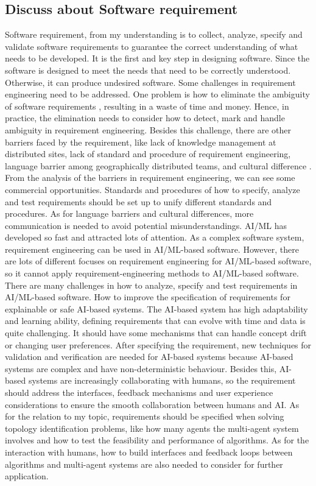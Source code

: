 \documentclass[11pt]{article}
\begin{document}
\subsection*{Discuss about Software requirement}
Software requirement, from my understanding is to collect, analyze, specify and validate software requirements to guarantee the correct understanding of what needs to be developed. It is the first and key step in designing software. Since the software is designed to meet the needs that need to be correctly understood. Otherwise, it can produce undesired software. Some challenges in requirement engineering need to be addressed. One problem is how to eliminate the ambiguity of software requirements \cite{gervasi2019ambiguity}, resulting in a waste of time and money. Hence, in practice, the elimination needs to consider how to detect, mark and handle ambiguity in requirement engineering. Besides this challenge, there are other barriers faced by the requirement, like lack of knowledge management at distributed sites, lack of standard and procedure of requirement engineering, language barrier among geographically distributed teams, and cultural difference \cite{akbar2020systematic}. From the analysis of the barriers in requirement engineering, we can see some commercial opportunities. Standards and procedures of how to specify, analyze and test requirements should be set up to unify different standards and procedures. As for language barriers and cultural differences, more communication is needed to avoid potential misunderstandings. AI/ML has developed so fast and attracted lots of attention. As a complex software system, requirement engineering can be used in AI/ML-based software. However, there are lots of different focuses on requirement engineering for AI/ML-based software, so it cannot apply requirement-engineering methods to AI/ML-based software. There are many challenges in how to analyze, specify and test requirements in AI/ML-based software. How to improve the specification of requirements for explainable or safe AI-based systems. The AI-based system has high adaptability and learning ability, defining requirements that can evolve with time and data is quite challenging. It should have some mechanisms that can handle concept drift or changing user preferences.  After specifying the requirement, new techniques for validation and verification are needed for AI-based systems because AI-based systems are complex and have non-deterministic behaviour. Besides this, AI-based systems are increasingly collaborating with humans, so the requirement should address the interfaces, feedback mechanisms and user experience considerations to ensure the smooth collaboration between humans and AI. As for the relation to my topic, requirements should be specified when solving topology identification problems, like how many agents the multi-agent system involves and how to test the feasibility and performance of algorithms. As for the interaction with humans, how to build interfaces and feedback loops between algorithms and multi-agent systems are also needed to consider for further application.
\\
\end{document}
